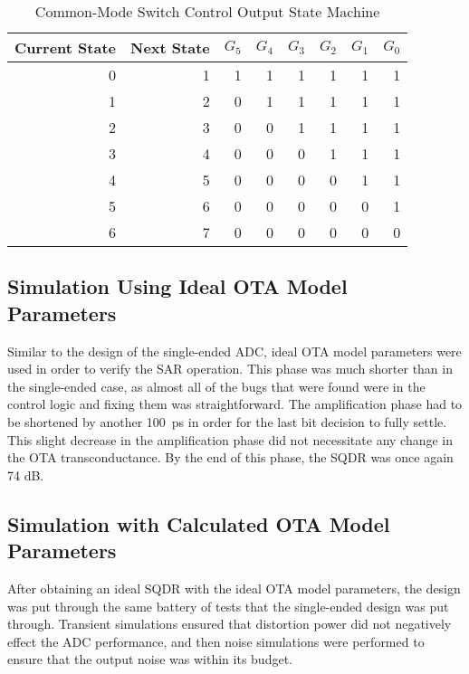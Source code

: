 \begin{table}[htbp]
\begin{center}
\begin{tabular}{|r|r|r|r|r|r|r|r|}
\hline
\multicolumn{1}{|l|}{Current State} & \multicolumn{1}{l|}{Next State} & \multicolumn{1}{l|}{$G_{5}$} & \multicolumn{1}{l|}{$G_{4}$} & \multicolumn{1}{l|}{$G_{3}$} & \multicolumn{1}{l|}{$G_{2}$} & \multicolumn{1}{l|}{$G_{1}$} & \multicolumn{1}{l|}{$G_{0}$} \\ \hline
0 & 1 & 1 & 1 & 1 & 1 & 1 & 1 \\ \hline
1 & 2 & 0 & 1 & 1 & 1 & 1 & 1 \\ \hline
2 & 3 & 0 & 0 & 1 & 1 & 1 & 1 \\ \hline
3 & 4 & 0 & 0 & 0 & 1 & 1 & 1 \\ \hline
4 & 5 & 0 & 0 & 0 & 0 & 1 & 1 \\ \hline
5 & 6 & 0 & 0 & 0 & 0 & 0 & 1 \\ \hline
6 & 7 & 0 & 0 & 0 & 0 & 0 & 0 \\ \hline
\end{tabular}
\end{center}
\caption{Common-Mode Switch Control Output State Machine}
\label{tab:statemachinegdiff}
\end{table}
\subsection{Simulation Using Ideal OTA Model Parameters}
Similar to the design of the single-ended ADC, ideal OTA model parameters were used in order to verify the SAR operation. This phase was much shorter than in the single-ended case, as almost all of the bugs that were found were in the control logic and fixing them was straightforward. The amplification phase had to be shortened by another \SI{100}{\pico\second} in order for the last bit decision to fully settle. This slight decrease in the amplification phase did not necessitate any change in the OTA transconductance. By the end of this phase, the SQDR was once again 74 dB.
\subsection{Simulation with Calculated OTA Model Parameters}
After obtaining an ideal SQDR with the ideal OTA model parameters, the design was put through the same battery of tests that the single-ended design was put through. Transient simulations ensured that distortion power did not negatively effect the ADC performance, and then noise simulations were performed to ensure that the output noise was within its budget.

